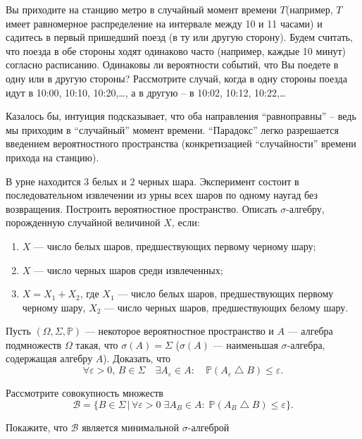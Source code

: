 \begin{problem}
Вы приходите на станцию метро в случайный момент времени $T$(например, $T$ имеет равномерное распределение на интервале между 10 и 11 часами) и садитесь в первый пришедший поезд (в ту или другую сторону). Будем считать, что поезда в обе стороны ходят одинаково часто (например, каждые 10 минут) согласно расписанию. Одинаковы ли вероятности событий, что Вы поедете в одну или в другую стороны? Рассмотрите случай, когда в одну стороны поезда идут в 10:00, 10:10, 10:20,\dots , а в другую -- в 10:02, 10:12, 10:22,\dots 
\end{problem}


\begin{remark} Казалось бы, интуиция подсказывает, что оба направления ``равноправны'' -- ведь мы приходим в ``случайный'' момент времени. ``Парадокс'' легко разрешается введением вероятностного пространства (конкретизацией ``случайности'' времени прихода на станцию).
\end{remark}

\begin{problem}
В урне находится $3$ белых и $2$ черных шара. 
Эксперимент состоит в последовательном извлечении из урны всех шаров по одному наугад без возвращения. Построить вероятностное пространство. 
Описать $\sigma$-алгебру, порожденную случайной величиной $X$, если: 
\begin{enumerate}
\item $X$ --- число белых шаров, предшествующих первому черному шару; 
\item $X$ --- число черных шаров среди извлеченных; 
\item $X=X_1+X_2$, где $X_1$ --- число белых шаров, предшествующих первому черному шару, 
$X_2$ --- число черных шаров, предшествующих белому шару. 
\end{enumerate}
\end{problem}


\begin{problem}\Star
\label{SigmaAlgebra}
Пусть $(\Omega,\Sigma,{\mathbb P})$ --- некоторое вероятностное пространство и $A$ --- алгебра подмножеств $\Omega$ такая, что 
$\sigma(A)=\Sigma$ ($\sigma(A)$ --- наименьшая $\sigma$-алгебра, содержащая алгебру $A$). Доказать, что 
$$
\forall\varepsilon>0,\, B\in\Sigma\quad \exists A_{\varepsilon}\in A:\quad {\mathbb P}(A_{\varepsilon}\bigtriangleup B)
\leqslant\varepsilon . 
$$
\end{problem}

\begin{ordre}
Рассмотрите совокупность множеств 
$$
{\mathcal B}=\bigl\{ B\in\Sigma\, | \, \forall\varepsilon>0 \; \exists A_B\in A:\; {\mathbb P}(A_B\bigtriangleup B)
\leqslant\varepsilon \bigr\} . 
$$

\noindent Покажите, что ${\mathcal B}$ является минимальной $\sigma$-алгеброй 

\end{ordre}



